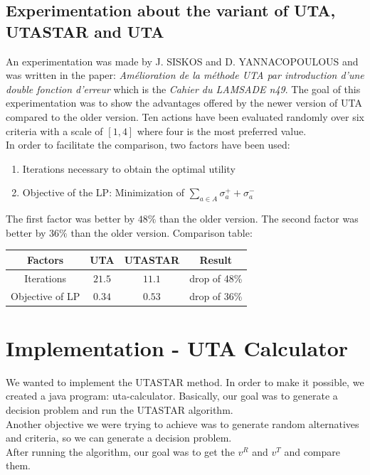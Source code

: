 \documentclass{report}
\begin{document}
\subsection{Experimentation about the variant of UTA, UTASTAR and UTA}
An experimentation was made by J. SISKOS and D. YANNACOPOULOUS and was written in the paper: \textit{Amélioration de la méthode UTA par introduction d'une double fonction d'erreur} which is the \textit{Cahier du LAMSADE n49}. The goal of this experimentation was to show the advantages offered by the newer version of UTA compared to the older version. Ten actions have been evaluated randomly over six criteria with a scale of $[1,4]$ where four is the most preferred value.\\

In order to facilitate the comparison, two factors have been used:
\begin{enumerate}
\item Iterations necessary to obtain the optimal utility
\item Objective of the LP: Minimization of $ \sum_{a \in A} \sigma _{a}^{+} + \sigma _{a}^{-} $ 
\end{enumerate}

The first factor was better by $48\%$ than the older version. The second factor was better by $36\%$ than the older version. 
Comparison table:

\begin{center}
\begin{tabular}{| c | c | c | c |} 
\hline
Factors & UTA & UTASTAR & Result \\
\hline
Iterations & $21.5$ & $11.1$ & drop of 48\% \\ 
\hline
Objective of LP & $0.34$ & $0.53$ & drop of 36\%\\ 
\hline
\end{tabular}
\end{center}

\newpage
\section{Implementation - UTA Calculator}
We wanted to implement the UTASTAR method. In order to make it possible, we created a java program: uta-calculator. Basically, our goal was to generate a decision problem and run the UTASTAR algorithm. \\
Another objective we were trying to achieve was to generate random alternatives and criteria, so we can generate a decision problem. \\
After running the algorithm, our goal was to get the $v^{R}$ and $v^{T}$ and compare them. 
\end{document}
